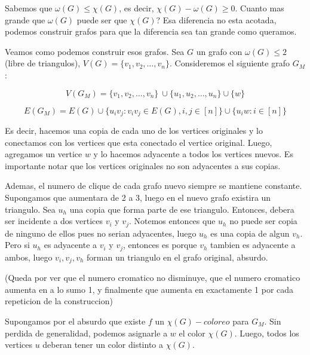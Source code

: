 \documentclass[APUNTE_COMPLEMENTOS.tex]{subfiles}
\begin{document}
Sabemos que $\omega(G) \leq \chi(G)$, es decir, $\chi(G) - \omega(G) \geq 0 $. Cuanto mas grande que $\omega(G)$ puede ser que $\chi(G)$? Esa diferencia no esta acotada, podemos construir grafos para que la diferencia sea tan grande como queramos.

\ex{
  \[\chi(K_n ) - \omega(K_n ) = n - n = 0  \]
  \[\chi(C_{2k + 1}) - \omega(C_{2k + 1}) = 3 - 2 = 1  \]
  \[\chi(M_8 ) - \omega(M_8 ) = 8 - 6 = 2  \]
}


Veamos como podemos construir esos grafos.
Sea $G$ un grafo con $\omega(G) \leq 2$ (libre de triangulos), $V(G) = \{v_1 , v_2 , \dots, v_n\}$. Consideremos el siguiente grafo $G_M$:

\[V(G_M )= \{v_1 , v_2 , \dots , v_n \}\ \cup \{u_1 , u_2 , \dots , u_n\} \cup \{w\}\]

\[E(G_M ) = E(G) \cup \{u_i v_j : v_i v_j \in E(G), i, j \in [n]\} \cup \{u_i w: i \in [n]\}      \]

Es decir, hacemos una copia de cada uno de los vertices originales y lo conectamos con los vertices que esta conectado el vertice original. Luego, agregamos un vertice $w$ y lo hacemos adyacente a todos los vertices nuevos.
Es importante notar que los vertices originales no son adyacentes a sus copias.

Ademas, el numero de clique de cada grafo nuevo siempre se mantiene constante. Supongamos que aumentara de 2 a 3, luego en el nuevo grafo existira un triangulo. Sea $u_h$ una copia que forma parte de ese triangulo. Entonces, debera ser incidente a dos vertices $v_i$ y $v_j$. Notemos entonces que $u_h$ no puede ser copia de ninguno de ellos pues no serian adyacentes, luego $u_h$ es una copia de algun $v_h$. Pero si $u_h$ es adyacente a $v_i$ y $v_j$, entonces es porque $v_h$ tambien es adyacente a ambos, luego $v_i , v_j, v_h$ forman un triangulo en el grafo original, absurdo.

(Queda por ver que el numero cromatico no disminuye, que el numero cromatico aumenta en a lo sumo 1, y finalmente que aumenta en exactamente 1 por cada repeticion de la construccion)

Supongamos por el absurdo que existe $f$ un $\chi(G) - coloreo$ para $G_M$. Sin perdida de generalidad, podemos asignarle a $w$ el color $\chi(G)$. Luego, todos los vertices $u$ deberan tener un color distinto a $\chi(G)$.
\end{document}
